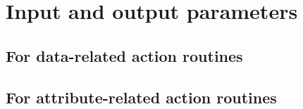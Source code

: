 \documentclass[final,12pt,a4paper,twoside]{book}
\begin{document}
\appendix

\chapter{Input and output parameters}

\section{For data-related action routines}

\label{parmtable}


\section{For attribute-related action routines}
\end{document}
